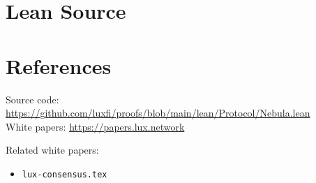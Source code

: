 \documentclass[11pt]{article}
\begin{document}
\section{Lean Source}


\section{References}
\noindent Source code: \url{https://github.com/luxfi/proofs/blob/main/lean/Protocol/Nebula.lean}\\
\noindent White papers: \url{https://papers.lux.network}

\noindent Related white papers:
\begin{itemize}
  \item \texttt{lux-consensus.tex}
\end{itemize}
\end{document}
